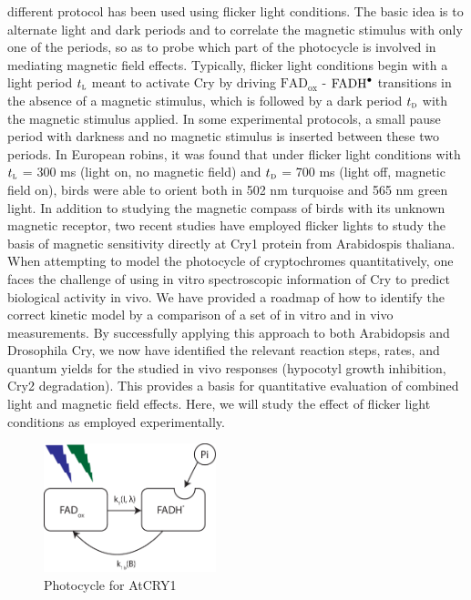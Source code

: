 \documentclass[twoside,twocolumn,9pt]{article}
\begin{document}
different protocol has been used using flicker light conditions. The basic idea is to alternate light and dark periods and to
correlate the magnetic stimulus with only one of the periods, so as to probe which part of the photocycle is involved in mediating
magnetic field effects. Typically, flicker light conditions begin with a light period $t_{\textsc{l}}$ meant to activate Cry by
driving $\text{FAD}_{\text{ox}}$ - $\ce{FADH^{.}}$ transitions in the absence of a magnetic stimulus, which is followed by a dark
period $t_{\textsc{d}}$ with the magnetic stimulus applied. In some experimental protocols, a small pause period with darkness and
no magnetic stimulus is inserted between these two periods. In European robins, it was found that under flicker light conditions
with $t_{\textsc{l}}$ = 300 ms (light on, no magnetic field) and $t_{\textsc{d}}$ = 700 ms (light off, magnetic field on), birds
were able to orient both in 502 nm turquoise and 565 nm green light.
In addition to studying the magnetic compass of birds with its unknown magnetic receptor, two recent studies have employed flicker
lights to study the basis of magnetic sensitivity directly at Cry1 protein from Arabidospis thaliana.
When attempting to model the photocycle of cryptochromes quantitatively, one faces the challenge of using in vitro spectroscopic
information of Cry to predict biological activity in vivo. We have provided a roadmap of how to identify the correct kinetic model
by a comparison of a set of in vitro and in vivo measurements. By successfully applying this approach to both Arabidopsis
\cite{Procopio2016} and Drosophila Cry, \cite{Arthaut2017} we now have identified the relevant reaction steps, rates, and quantum
yields for the studied in vivo responses (hypocotyl growth inhibition, Cry2 degradation). This provides a basis for quantitative
evaluation of combined light and magnetic field effects. Here, we will study the effect of flicker light conditions as employed
experimentally. \cite{Pooam2019, Wiltschko2014}
\begin{figure}[h]
	\centering
	\includegraphics[width = 5cm, keepaspectratio]{photocycleTwoState.pdf}
	\caption{Photocycle for AtCRY1}
	\label{fig:photocycle}
\end{figure}
\end{document}
